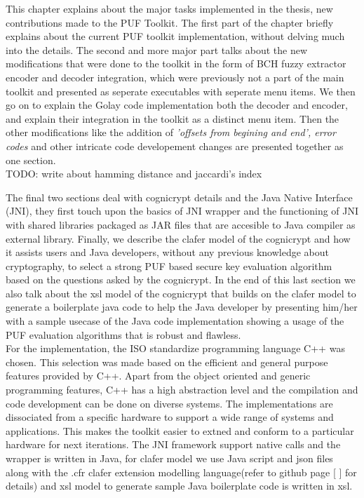 This chapter explains about the major tasks implemented in the thesis, new contributions made to the PUF Toolkit. The first part of the chapter briefly explains about the current PUF toolkit implementation, without delving much into the details. The second and more major part talks about the new modifications that were done to the toolkit in the form of BCH fuzzy extractor encoder and decoder integration, which were previously not a part of the main toolkit and presented as seperate executables
with seperate menu items. We then go on to explain the Golay code implementation both the decoder and encoder, and explain their integration in the toolkit as a distinct menu item. Then the other modifications like the addition of \emph{'offsets from begining and end', error codes} and other intricate code developement changes are presented together as one section.\\

TODO: write about hamming distance and jaccardi's index

The final two sections deal with cognicrypt details and the Java Native Interface (JNI), they first touch upon the basics of JNI
wrapper and the functioning of JNI with shared libraries packaged as JAR files that are accesible to Java compiler as external library. Finally, we describe the clafer model of the cognicrypt and how it assists users and Java developers, without any previous knowledge about cryptography, to select a strong PUF based secure key evaluation algorithm based on the questions asked by the cognicrypt. In the end of this last section we also talk about the xsl model of the cognicrypt that builds on
the clafer model to generate a boilerplate java code to help the Java developer by presenting him/her with a sample usecase of the Java code implementation showing a usage of the PUF evaluation algorithms that is robust and flawless.\\

For the implementation, the ISO standardize programming language C++ was chosen. This selection was made based on the efficient and general purpose features provided by C++. Apart from the object oriented and generic programming features, C++ has a high abstraction level and the compilation and code development can be done on diverse systems. The implementations are dissociated from a specific hardware to support a wide range of systems and applications. This makes the toolkit easier
to extned and conform to a particular hardware for next iterations. The JNI framework support native calls and the wrapper is written in Java, for clafer model we use Java script and json files along with the .cfr clafer extension modelling language(refer to github page [ ] for details) and xsl model to generate sample Java boilerplate code is written in xsl.\\

